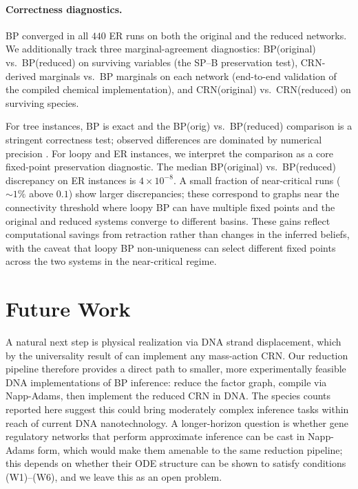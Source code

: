 \documentclass{article}
\theoremstyle{plain}
\theoremstyle{definition}
\theoremstyle{remark}
\newcommand{\<}{\langle}
\renewcommand{\>}{\rangle}
\begin{document}
\paragraph{Correctness diagnostics.}
BP converged in all $440$ ER runs on both the original 
and the reduced networks. We additionally track three 
marginal-agreement diagnostics: BP(original) vs.\ 
BP(reduced) on surviving variables (the SP--B preservation 
test), CRN-derived marginals vs.\ BP marginals on each 
network (end-to-end validation of the compiled chemical 
implementation), and CRN(original) vs.\ CRN(reduced) on 
surviving species. 

For tree instances, BP is exact and the BP(orig) vs.\ 
BP(reduced) comparison is a stringent correctness test; 
observed differences are dominated by numerical precision . For loopy and ER instances, we interpret 
the comparison as a core fixed-point preservation 
diagnostic. The median BP(original) vs.\ BP(reduced) discrepancy 
on ER instances is $4 \times 10^{-8}$. A small fraction of 
near-critical runs ($\sim 1\%$ above $0.1$) show larger 
discrepancies; these correspond to graphs near the 
connectivity threshold where loopy BP can have multiple 
fixed points and the original and reduced systems converge 
to different basins. These gains 
reflect computational savings from retraction rather than 
changes in the inferred beliefs, with the caveat that 
loopy BP non-uniqueness can select different 
fixed points across the two systems in the near-critical 
regime.

\section*{Future Work}
A natural next step is physical realization via DNA strand displacement, which by the universality result of \cite{doi:10.1073/pnas.0909380107} can implement any mass-action CRN. Our reduction pipeline therefore provides a direct path to smaller, more experimentally feasible DNA implementations of BP inference: reduce the factor graph, compile via Napp-Adams, then implement the reduced CRN in DNA. The species counts reported here suggest this could bring moderately complex inference tasks within reach of current DNA nanotechnology. A longer-horizon question is whether gene regulatory networks that perform approximate inference can be cast in Napp-Adams form, which would make them amenable to the same reduction pipeline; this depends on whether their ODE structure can be shown to satisfy conditions (W1)–(W6), and we leave this as an open problem.
\end{document}
